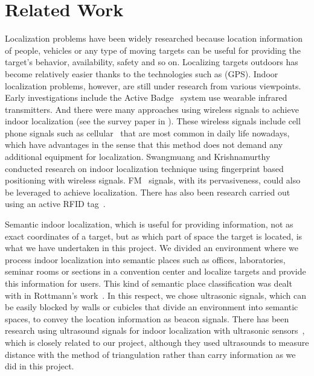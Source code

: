 \section{Related Work}
\label{sec:related-works}

Localization problems have been widely researched because location information of people, vehicles or any type of moving targets can be useful for providing the target's behavior, availability, safety and so on. Localizing targets outdoors has become relatively easier thanks to the technologies such as (GPS). Indoor localization problems, however, are still under research from various viewpoints. Early investigations include the Active Badge~\cite{want1992active} system use wearable infrared transmitters. And there were many approaches using wireless signals to achieve indoor localization (see the survey paper in \cite{liu2007}). These wireless signals include cell phone signals such as cellular~\cite{otsason2005accurate} that are most common in daily life nowadays, which have advantages in the sense that this method does not demand any additional equipment for localization. Swangmuang and Krishnamurthy~\cite{Swangmuang2008} conducted research on indoor localization technique using fingerprint based positioning with wireless signals. FM~\cite{chen2012fm} signals, with its pervasiveness, could also be leveraged to achieve localization. There has also been research carried out using an active RFID tag~\cite{Jin2006, buettner2009recognizing}.

Semantic indoor localization, which is useful for providing information, not as exact coordinates of a target, but as which part of space the target is located, is what we have undertaken in this project. We divided an environment where we process indoor localization into semantic places such as offices, laboratories, seminar rooms or sections in a convention center and localize targets and provide this information for users. This kind of semantic place classification was dealt with in Rottmann's work~\cite{rottmann2005semantic}. In this respect, we chose ultrasonic signals, which can be easily blocked by walls or cubicles that divide an environment into semantic spaces, to convey the location information as beacon signals. There has been research using ultrasound signals for indoor localization with ultrasonic sensors~\cite{feng1997mobile, priyantha2005cricket}, which is closely related to our project, although they used ultrasounds to measure distance with the method of triangulation rather than carry information as we did in this project.

